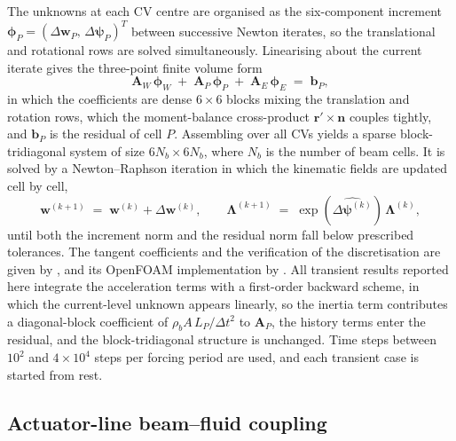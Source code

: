 \noindent
The unknowns at each CV centre are organised as the six-component increment $\boldsymbol{\phi}_P = (\Delta\mathbf{w}_P,\,\Delta\boldsymbol{\psi}_P)^{T}$ between successive Newton iterates, so the translational and rotational rows are solved simultaneously. Linearising about the current iterate gives the three-point finite volume form
\begin{equation}
\mathbf{A}_{W}\,\boldsymbol{\phi}_{W} \;+\; \mathbf{A}_{P}\,\boldsymbol{\phi}_{P} \;+\; \mathbf{A}_{E}\,\boldsymbol{\phi}_{E} \;=\; \mathbf{b}_{P},
\label{eq:fvDiscreteSystem}
\end{equation}
in which the coefficients are dense $6\times 6$ blocks mixing the translation and rotation rows, which the moment-balance cross-product $\mathbf{r}'\times\mathbf{n}$ couples tightly, and $\mathbf{b}_{P}$ is the residual of cell $P$. Assembling over all CVs yields a sparse block-tridiagonal system of size $6N_b\times 6N_b$, where $N_b$ is the number of beam cells. It is solved by a Newton--Raphson iteration in which the kinematic fields are updated cell by cell,
\begin{equation}
\mathbf{w}^{(k+1)} \;=\; \mathbf{w}^{(k)} + \Delta\mathbf{w}^{(k)},
\qquad
\boldsymbol{\Lambda}^{(k+1)} \;=\; \exp\!\left(\widehat{\Delta\boldsymbol{\psi}^{(k)}}\right)\,\boldsymbol{\Lambda}^{(k)},
\label{eq:beamNewtonUpdate}
\end{equation}
until both the increment norm and the residual norm fall below prescribed tolerances. The tangent coefficients and the verification of the discretisation are given by \citet{bali_cell-centered_2022,bali_finite_2024}, and its OpenFOAM implementation by \citet{bali_beamfoam_2025}. All transient results reported here integrate the acceleration terms with a first-order backward scheme, in which the current-level unknown appears linearly, so the inertia term contributes a diagonal-block coefficient of $\rho_{b}A\,L_{P}/\Delta t^{2}$ to $\mathbf{A}_{P}$, the history terms enter the residual, and the block-tridiagonal structure is unchanged. Time steps between $10^{2}$ and $4\times10^{4}$ steps per forcing period are used, and each transient case is started from rest.

\subsection{Actuator-line beam--fluid coupling}
\label{sec:almCouplingTheory}


